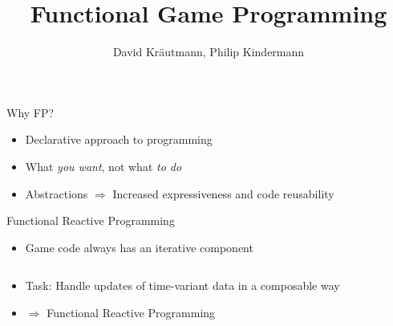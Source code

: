 \documentclass[trans]{beamer}
\title{Functional Game Programming}
\author{David Kr\"{a}utmann, Philip Kindermann}
\institute{RWTH Aachen}
\begin{document}
\begin{frame}
  \titlepage
\end{frame}

\begin{frame}{Why FP?}
    \begin{itemize}
        \item<alert@+> Declarative approach to programming
        \item<alert@+> What \textit{you want}, not what \textit{to do}
        \item<alert@+> Abstractions \(\Rightarrow\) Increased expressiveness and code reusability
    \end{itemize}
\end{frame}


\begin{frame}{Functional Reactive Programming}
    \begin{itemize}
        \item Game code always has an iterative component
        \small{\inputminted{haskell}{Loop.hs}}
        \item Task: Handle updates of time-variant data in a composable way
        \item \(\Rightarrow\) Functional Reactive Programming
    \end{itemize}
\end{frame}
\end{document}
